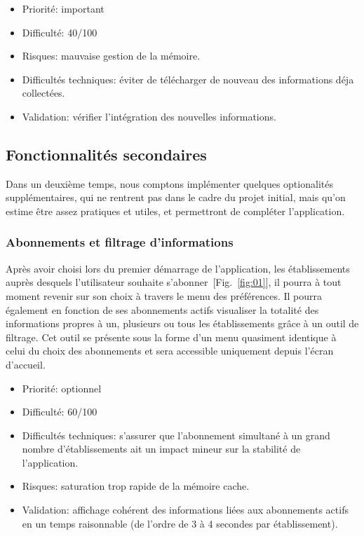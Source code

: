 \documentclass [pdftex,12pt] {report}
\begin{document}
\begin{itemize}
\renewcommand{\labelitemi}{$\bullet$}
\item Priorité: important
\item Difficulté: 40/100
\item Risques: mauvaise gestion de la mémoire.
\item Difficultés techniques: éviter de télécharger de nouveau des informations déja collectées.
\item Validation: vérifier l'intégration des nouvelles informations.
\end{itemize}


\subsection{Fonctionnalités secondaires}
Dans un deuxième temps, nous comptons implémenter quelques optionalités supplémentaires, qui ne rentrent pas dans le cadre du projet initial, mais qu'on estime être assez pratiques et utiles, et permettront de compléter l'application.

\subsubsection{Abonnements et filtrage d'informations}
Après avoir choisi lors du premier démarrage de l'application, les établissements auprès desquels l'utilisateur souhaite s'abonner~[Fig.~\ref{fig:01}], il pourra à tout moment revenir sur son choix à travers le menu des préférences.
Il pourra également en fonction de ses abonnements actifs visualiser la totalité des informations propres à un, plusieurs ou tous les établissements grâce à un outil de filtrage. Cet outil se présente sous la forme d'un menu quasiment identique à celui du choix des abonnements et sera accessible uniquement depuis l'écran d'accueil. \\

\begin{itemize}
\renewcommand{\labelitemi}{$\bullet$}
\item Priorité: optionnel
\item Difficulté: 60/100
\item Difficultés techniques: s'assurer que l'abonnement simultané à un grand nombre d'établissements ait un impact mineur sur la stabilité de l'application.
\item Risques: saturation trop rapide de la mémoire cache.
\item Validation: affichage cohérent des informations liées aux abonnements actifs en un temps raisonnable (de l'ordre de 3 à 4 secondes par établissement).
\end{itemize}
\end{document}

